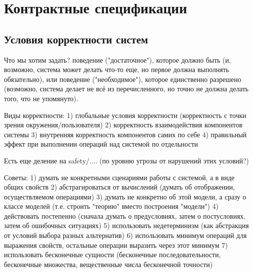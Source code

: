 \documentclass[14pt, twoside]{extreport}
\begin{document}
    

    


\chapter{Контрактные спецификации}




\section{Условия корректности систем}

Что мы хотим задать? поведение ("достаточное"), которое должно быть (и, возможно, система может делать что-то еще, но первое должна выполнять обязательно), или поведение ("необходимое"), которое единственно разрешено (возможно, система делает не всё из перечисленного, но точно не должна делать того, что не упомянуто).

Виды корректности:
1) глобальные условия корректности (корректность с точки зрения окружения/пользователя)
2) корректность взаимодействия компонентов системы
3) внутренняя корректность компонентов самих по себе
4) правильный эффект при выполнении операций над системой по отдельности


Есть еще деление на safety/.... (по уровню угрозы от нарушений этих условий?)


Советы:
1) думать не конкретными сценариями работы с системой, а в виде общих свойств
2) абстрагироваться от вычислений (думать об отображении, осуществляемом операциями)
3) думать не конкретно об этой модели, а сразу о классе моделей (т.е. строить "теорию" вместо построения "модели")
4) действовать постепенно (сначала думать о предусловиях, затем о постусловиях, затем об ошибочных ситуациях)
5) использовать недетерминизм (как абстракция от условий выбора разных альтернатив)
6) использовать минимум операций для выражения свойств, остальные операции выразить через этот минимум
7) использовать бесконечные сущности (бесконечные последовательности, бесконечные множества, вещественные числа бесконечной точности) 
\end{document}
